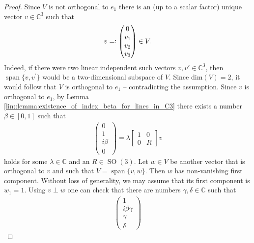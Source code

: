 \documentclass{amsart}
\newcommand{\C}{\mathbb{C}}
\DeclareMathOperator{\SO}{SO}
\DeclareMathOperator{\spann}{span}
\begin{document}
\begin{proof}
         Since $V$ is not orthogonal to $e_1$ there is an (up to a scalar factor) unique vector $v \in \C^3$ such that
        \begin{align*}
            v =\vcentcolon \begin{pmatrix}
                0 \\ v_1 \\ v_2 \\ v_3
            \end{pmatrix}
            \in V.
        \end{align*}
     Indeed, if there were two linear independent such vectors $v, v' \in \C^3$, then $\spann\{v,v^\prime\}$ would be a two-dimensional subspace of $V$. Since $\mathrm{dim}(V)=2$, it would follow that $V$ is orthogonal to $e_1$ -- contradicting the assumption. 
    Since $v$ is orthogonal to $e_1$, by Lemma \ref{lin::lemma:existence_of_index_beta_for_lines_in_C3} there exists a number $\beta \in [0,1]$ such that
    \begin{align*}
            \begin{pmatrix}
                0 \\ 1 \\ i \beta \\ 0
            \end{pmatrix}
            = \lambda
            \left[\begin{array}{c|c}
            1& 0 \\
            \hline
            0 & R
            \end{array}\right] 
            v
    \end{align*}
    holds for some $\lambda\in\C$ and an $R\in\SO(3)$. 
    Let $w\in V$ be another vector that is orthogonal to $v$ and such that $V=\spann\{v,w\}$. Then $w$ has non-vanishing first component. Without loss of generality, we may assume that its first component is $w_1=1$. Using $v\perp w$ one can check that there are numbers $\gamma,\delta\in\C$ such that
    \begin{align*}
        \begin{pmatrix}
            1 \\ i \beta \gamma \\ \gamma \\ \delta
        \end{pmatrix}

\end{align*}
\end{proof}
\end{document}
